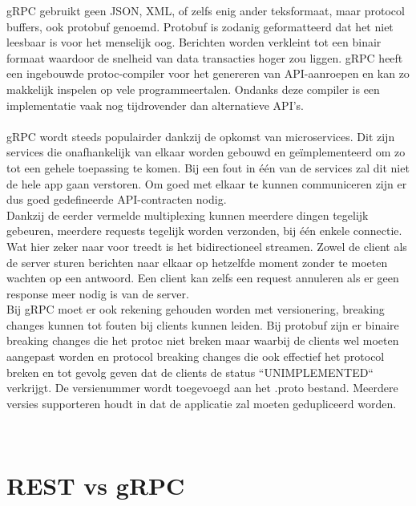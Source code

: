 gRPC gebruikt geen JSON, XML, of zelfs enig ander teksformaat, maar protocol buffers, ook protobuf genoemd. Protobuf is zodanig geformatteerd dat het niet leesbaar is
voor het menselijk oog. Berichten worden verkleint tot een binair formaat waardoor de snelheid van data transacties hoger zou liggen. gRPC heeft een ingebouwde
protoc-compiler voor het genereren van API-aanroepen en kan zo makkelijk inspelen op vele programmeertalen.
Ondanks deze compiler is een implementatie vaak nog tijdrovender dan alternatieve API's.
~\autocite{googleprotobufguide}\\
~\autocite{dreamfactory}\\

gRPC wordt steeds populairder dankzij de opkomst van microservices. Dit zijn services die onafhankelijk van elkaar worden gebouwd en geïmplementeerd om
zo tot een gehele toepassing te komen. Bij een fout in één van de services zal dit niet de hele app gaan verstoren.
Om goed met elkaar te kunnen communiceren zijn er dus goed gedefineerde API-contracten nodig.
~\autocite{microsoft}\\

Dankzij de eerder vermelde multiplexing kunnen meerdere dingen tegelijk gebeuren, meerdere requests tegelijk worden verzonden, bij één enkele connectie.
Wat hier zeker naar voor treedt is het bidirectioneel streamen. Zowel de client als de server sturen berichten naar elkaar op hetzelfde moment zonder te moeten wachten
op een antwoord. Een client kan zelfs een request annuleren als er geen response meer nodig is van de server.
~\autocite{freecodecamp}\\

Bij gRPC moet er ook rekening gehouden worden met versionering, breaking changes kunnen tot fouten bij clients kunnen leiden.
Bij protobuf zijn er binaire breaking changes die het protoc niet breken maar waarbij de clients wel moeten aangepast worden en protocol breaking changes
die ook effectief het protocol breken en tot gevolg geven dat de clients de status ``UNIMPLEMENTED`` verkrijgt. De versienummer wordt toegevoegd aan
het .proto bestand. Meerdere versies supporteren houdt in dat de applicatie zal moeten gedupliceerd worden.

~\autocite{grpcversion}\\

\section{REST vs gRPC}

